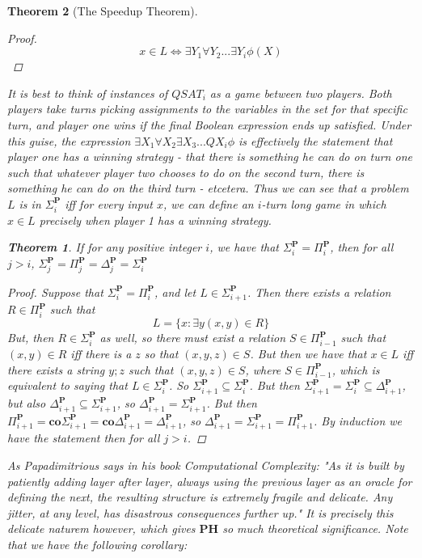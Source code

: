 \documentclass{article}
\theoremstyle{definition}
\theoremstyle{plain}
\theoremstyle{theorem}
\newtheorem{theorem}{Theorem}[section]
\begin{document}
\begin{theorem}[The Speedup Theorem]
\begin{proof}
    \[ x \in L \iff \exists Y_1 \forall Y_2... \exists Y_i \phi(X) \]
\end{proof}
It is best to think of instances of $QSAT_i$ as a game between two players. Both players take turns picking assignments to the variables in the set for that specific turn, and player one wins if the final Boolean expression ends up satisfied. Under this guise, the expression $\exists X_1 \forall X_2 \exists X_3... QX_i \phi$ is effectively the statement that player one has a \textit{winning strategy} - that there is something he can do on turn one such that whatever player two chooses to do on the second turn, there is something he can do on the third turn - etcetera. Thus we can see that a problem $L$ is in $\Sigma_i^{\textbf{P}}$ iff for every input $x$, we can define an $i$-turn long game in which $x \in L$ precisely when player 1 has a winning strategy. 
\begin{theorem}
    If for any positive integer $i$, we have that $\Sigma_i^{\textbf{P}} = \Pi_i^{\textbf{P}}$, then for all $j > i$, $\Sigma_j^{\textbf{P}} = \Pi_j^{\textbf{P}} = \Delta_j^{\textbf{P}} = \Sigma_i^{\textbf{P}}$
\end{theorem}
\begin{proof}
    Suppose that $\Sigma_i^{\textbf{P}} = \Pi_i^{\textbf{P}}$, and let $L \in \Sigma_{i+1}^{\textbf{P}}$. Then there exists a relation $R \in \Pi_i^{\textbf{P}}$ such that 
    \[L = \{x: \exists y (x,y) \in R\} \]
    But, then $R \in \Sigma_i^{\textbf{P}}$ as well, so there must exist a relation $S \in \Pi_{i-1}^{\textbf{P}}$ such that $(x,y) \in R$ iff there is a $z$ so that $(x,y,z) \in S$. But then we have that $x \in L$ iff there exists a string $y;z$ such that $(x,y,z) \in S$, where $S \in \Pi_{i-1}^{\textbf{P}}$, which is equivalent to saying that $L \in \Sigma_i^{\textbf{P}}$. So $\Sigma_{i+1}^{\textbf{P}} \subseteq \Sigma_i^{\textbf{P}}$.
    But then $\Sigma_{i+1}^{\textbf{P}} = \Sigma_i^{\textbf{P}} \subseteq \Delta_{i+1}^{\textbf{P}}$, but also $\Delta_{i+1}^{\textbf{P}} \subseteq \Sigma_{i+1}^{\textbf{P}}$, so $\Delta_{i+1}^{\textbf{P}} = \Sigma_{i+1}^{\textbf{P}}$. But then $\Pi_{i+1}^{\textbf{P}} = \textbf{co}\Sigma_{i+1}^{\textbf{P}} = \textbf{co}\Delta_{i+1}^{\textbf{P}} = \Delta_{i+1}^{\textbf{P}}$, so $\Delta_{i+1}^{\textbf{P}} = \Sigma_{i+1}^{\textbf{P}} = \Pi_{i+1}^{\textbf{P}}$. By induction we have the statement then for all $j > i$.
\end{proof}
As Papadimitrious says in his book \textit{Computational Complexity}: "\textit{As it is built by patiently adding layer after layer, always using the previous layer as an oracle for defining the next, the resulting structure is extremely fragile and delicate. Any jitter, at any level, has disastrous consequences further up.}" It is precisely this delicate naturem however, which gives $\textbf{PH}$ so much theoretical significance. Note that we have the following corollary:

\end{theorem}
\end{document}
